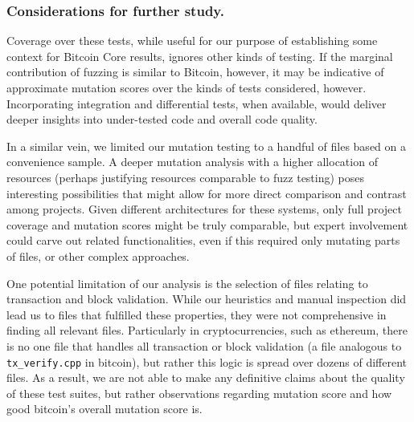 %

\subsubsection*{Considerations for further study.}

Coverage over these tests, while useful for our purpose of
establishing some context for Bitcoin Core results, ignores
other kinds of testing. If the marginal contribution of fuzzing is
similar to Bitcoin, however, it may be indicative of approximate
mutation scores over the kinds of tests considered, however.
Incorporating integration and differential tests, when available, would deliver deeper insights into under-tested code and overall code quality.

In a similar vein, we limited our mutation testing to a handful of files based
on a convenience sample. A deeper mutation analysis with a higher allocation of
resources (perhaps justifying resources comparable to fuzz testing) poses interesting
possibilities that might allow for more direct comparison and contrast among
projects.  Given different architectures for these systems, only full
project coverage and mutation scores might be truly comparable, but
expert involvement could carve out related functionalities, even if
this required only mutating parts of files, or other complex approaches.

\iffalse
One potential limitation of our analysis is the selection of files relating to transaction and block validation. While our heuristics and manual inspection did lead us to files that fulfilled these
properties, they were not comprehensive in finding all relevant files.
Particularly in cryptocurrencies, such as ethereum, there is no one file that
handles all transaction or block validation (a file analogous to {\tt
  tx\_verify.cpp} in bitcoin), but rather this logic is spread over dozens of
different files. As a result, we are not able to make any definitive claims
about the quality of these test suites, but rather observations regarding
mutation score and how good bitcoin's overall mutation score is.

